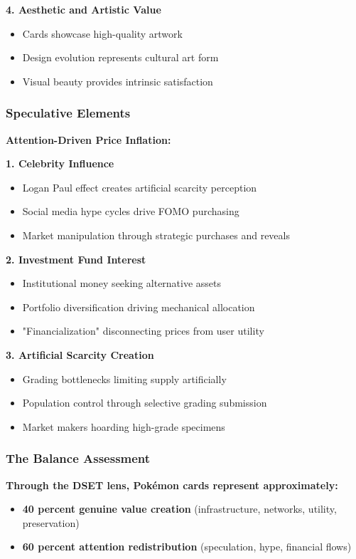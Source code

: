 \documentclass[11pt,oneside]{book}
\begin{document}
\textbf{4. Aesthetic and Artistic Value}
\begin{itemize}
\item Cards showcase high-quality artwork
\item Design evolution represents cultural art form
\item Visual beauty provides intrinsic satisfaction
\end{itemize}

\subsubsection{Speculative Elements}

\textbf{Attention-Driven Price Inflation:}

\textbf{1. Celebrity Influence}
\begin{itemize}
\item Logan Paul effect creates artificial scarcity perception
\item Social media hype cycles drive FOMO purchasing
\item Market manipulation through strategic purchases and reveals
\end{itemize}

\textbf{2. Investment Fund Interest}
\begin{itemize}
\item Institutional money seeking alternative assets
\item Portfolio diversification driving mechanical allocation
\item "Financialization" disconnecting prices from user utility
\end{itemize}

\textbf{3. Artificial Scarcity Creation}
\begin{itemize}
\item Grading bottlenecks limiting supply artificially
\item Population control through selective grading submission
\item Market makers hoarding high-grade specimens
\end{itemize}

\subsubsection{The Balance Assessment}

\textbf{Through the DSET lens, Pokémon cards represent approximately:}
\begin{itemize}
\item \textbf{40 percent genuine value creation} (infrastructure, networks, utility, preservation)
\item \textbf{60 percent attention redistribution} (speculation, hype, financial flows)
\end{itemize}
\end{document}
